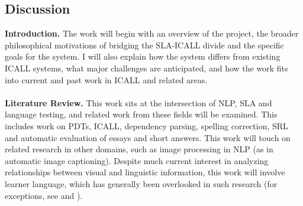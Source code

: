 \documentclass[11pt]{article}
\begin{document}
\subsection{Discussion}
\label{discussion}
\textbf{Introduction.} The work will begin with an overview of the project, the broader philosophical motivations of bridging the SLA-ICALL divide and the specific goals for the system. I will also explain how the system differs from existing ICALL systems, what major challenges are anticipated, and how the work fits into current and past work in ICALL and related areas.\\
\\
\textbf{Literature Review.} This work sits at the intersection of NLP, SLA and language testing, and related work from these fields will be examined. This includes work on PDTs, ICALL, dependency parsing, spelling correction, SRL and automatic evaluation of essays and short answers. This work will touch on related research in other domains, such as image processing in NLP (as in automatic image captioning). Despite much current interest in analyzing relationships between visual and linguistic information, this work will involve learner language, which has generally been overlooked in such research (for exceptions, see \cite{somasundaran:chodorow:14} and \cite{somasundaran:ea:15}). 
\end{document}
